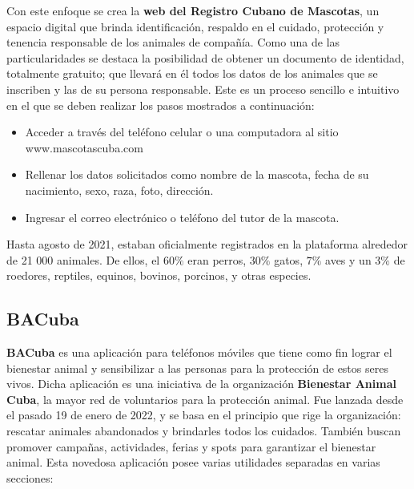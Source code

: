 Con este enfoque se crea la \textbf{web del Registro Cubano de Mascotas}, un espacio digital que brinda identificación, respaldo en el cuidado, protección y tenencia responsable de los animales de compañía. Como una de las particularidades se destaca la posibilidad de obtener un documento de identidad, totalmente gratuito; que llevará en él todos los datos de los animales que se inscriben y las de su persona responsable. Este es un proceso sencillo e intuitivo en el que se deben realizar los pasos mostrados a continuación:

\begin{itemize}
\item Acceder a través del teléfono celular o una computadora al sitio www.mascotascuba.com
\item Rellenar los datos solicitados como nombre de la mascota, fecha de su nacimiento, sexo, raza, foto, dirección.
\item Ingresar el correo electrónico o teléfono del tutor de la mascota.
\end{itemize}

Hasta agosto de 2021, estaban oficialmente registrados en la plataforma alrededor de 21 000 animales. De ellos, el $60 \%$ eran perros, $30 \%$ gatos, $7 \%$ aves y un $3 \%$ de roedores, reptiles, equinos, bovinos, porcinos, y otras especies.

\subsection{BACuba}\label{chapter:introduction}



\textbf{ BACuba}  es una aplicación para teléfonos móviles que tiene como fin lograr el bienestar animal y sensibilizar a las personas para la protección de estos seres vivos. Dicha aplicación es una iniciativa de la organización \textbf{Bienestar Animal Cuba}, la mayor red de voluntarios para la protección animal. Fue lanzada desde el pasado 19 de enero de 2022, y se basa en el principio que rige la organización: rescatar animales abandonados y brindarles todos los cuidados. También buscan promover campañas, actividades, ferias y spots para garantizar el bienestar animal. Esta novedosa aplicación posee varias utilidades separadas en varias secciones:

